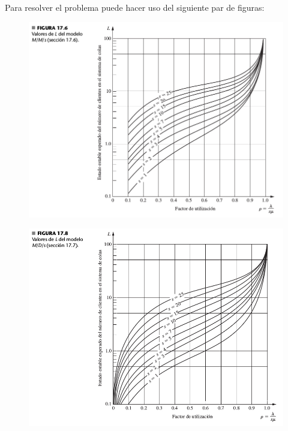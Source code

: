 \documentclass[ a4paper, twoside, 11pt]{article}
\begin{document}
\begin{problem}
Para resolver el problema puede hacer uso del siguiente par de figuras: 
\begin{figure}[H]
\centering
\includegraphics[width = 1.06\columnwidth]{figures/fig_metricas-MMS.jpg}
\end{figure}
\begin{figure}[H]
\centering
\includegraphics[width = 1.06\columnwidth]{figures/fig_metricas-MDS.jpg}
\end{figure}

\QED

\end{problem}
\fullskip
\end{document}
